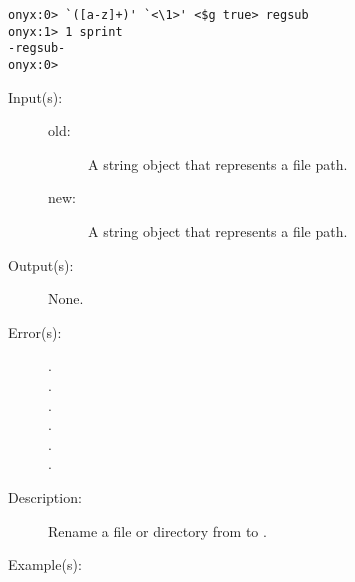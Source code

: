 \begin{description}
\begin{description}
\begin{verbatim}
onyx:0> `([a-z]+)' `<\1>' <$g true> regsub
onyx:1> 1 sprint
-regsub-
onyx:0>
		\end{verbatim}
	\end{description}
\label{systemdict:rename}
\item[{\onyxop{old new}{rename}{--}}: ]
	\begin{description}\item[]
	\item[Input(s): ]
		\begin{description}\item[]
		\item[old: ]
			A string object that represents a file path.
		\item[new: ]
			A string object that represents a file path.
		\end{description}
	\item[Output(s): ] None.
	\item[Error(s): ]
		\begin{description}\item[]
		\item[.]
		\item[.]
		\item[.]
		\item[.]
		\item[.]
		\item[.]
		\end{description}
	\item[Description: ]
		Rename a file or directory from  to .
	\item[Example(s): ]\begin{verbatim}


\end{verbatim}
\end{description}
\end{description}
